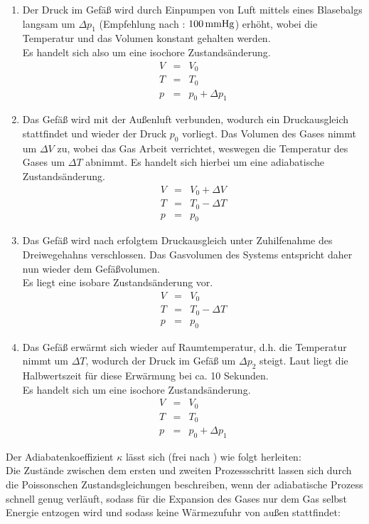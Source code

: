 \documentclass[a4paper,titlepage]{scrartcl}
\numberwithin{equation}{section}
\begin{document}
\begin{enumerate}
\item Der Druck im Gefäß wird durch Einpumpen von Luft mittels eines Blasebalgs langsam um $\Delta p_1$ (Empfehlung nach \cite{walcher}: $\unit[100] {mm Hg}$) erhöht, wobei die Temperatur und das Volumen konstant gehalten werden.\\
Es handelt sich also um eine isochore Zustandsänderung.
\begin{eqnarray*}
V&=&V_0\\
T&=&T_0\\
p&=&p_0+\Delta p_1
\end{eqnarray*}
\item Das Gefäß wird mit der Außenluft verbunden, wodurch ein Druckausgleich stattfindet und wieder der Druck $p_0$ vorliegt. Das Volumen des Gases nimmt um $\Delta V$ zu, wobei das Gas Arbeit verrichtet, weswegen die Temperatur des Gases um $\Delta T$ abnimmt. Es handelt sich hierbei um eine adiabatische Zustandsänderung.
\begin{eqnarray*}
V&=&V_0+\Delta V\\
T&=&T_0-\Delta T\\
p&=&p_0
\end{eqnarray*}
\item  Das Gefäß wird nach erfolgtem Druckausgleich unter Zuhilfenahme des Dreiwegehahns verschlossen. Das Gasvolumen des Systems entspricht daher nun wieder dem Gefäßvolumen.\\
Es liegt eine isobare Zustandsänderung vor.
\begin{eqnarray*}
V&=&V_0\\
T&=&T_0-\Delta T\\
p&=&p_0
\end{eqnarray*}
\item  Das Gefäß erwärmt sich wieder auf Raumtemperatur, d.h. die Temperatur nimmt um $\Delta T$, wodurch der Druck im Gefäß um $\Delta p_2$ steigt. Laut \cite{walcher} liegt die Halbwertszeit für
diese Erwärmung bei ca. 10 Sekunden.\\
Es handelt sich um eine isochore Zustandsänderung.
\begin{eqnarray*}
V&=&V_0\\
T&=&T_0\\
p&=&p_0+\Delta p_1
\end{eqnarray*}
\end{enumerate}
Der Adiabatenkoeffizient $\kappa$ lässt sich (frei nach \cite{walcher}) wie folgt herleiten:\\
Die Zustände zwischen dem ersten und zweiten Prozessschritt lassen sich durch die Poissonschen Zustandsgleichungen beschreiben, wenn der adiabatische Prozess schnell genug verläuft, sodass für die Expansion des Gases nur dem Gas selbst Energie entzogen wird und sodass keine Wärmezufuhr von außen stattfindet:
\end{document}
